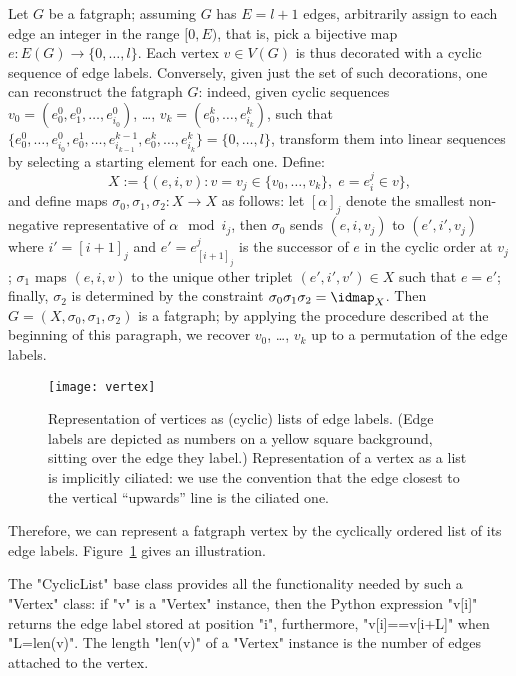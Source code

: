 Let $G$ be a fatgraph; assuming $G$ has $E = l+1$ edges, arbitrarily
assign to each edge an integer in the range $[0, E)$, that is, pick a
bijective map $e: E(G) \to \{0, \dots, l\}$.  Each vertex $v \in V(G)$
is thus decorated with a cyclic sequence of edge labels.  Conversely,
given just the set of such decorations, one can reconstruct the
fatgraph $G$: indeed, given cyclic sequences $v_0 = (e_0^0, e^0_1,
\ldots, e^0_{i_0})$, \ldots, $v_k = (e^k_0, \ldots, e^k_{i_k})$, such
that $\{e^0_0, \ldots, e^0_{i_0}, e^1_0, \ldots, e^{k-1}_{i_{k-1}},
e^k_0, \ldots, e^k_{i_k}\} = \{0, \ldots, l\}$, transform them into
linear sequences by selecting a starting element for each one.  Define:
\begin{equation*}
  X := \{ (e, i, v) : v = v_j \in \{v_0, \ldots, v_k\},\; 
                        e = e^j_i \in v \},
\end{equation*}
and define maps $\sigma_0, \sigma_1, \sigma_2: X \to X$ as follows:
let $[\alpha]_j$ denote the smallest non-negative representative of
$\alpha \mod i_j$, then $\sigma_0$ sends $(e, i, v_j)$ to $(e', i', v_j)$
where $i' = [i+1]_j$ and $e' = e^j_{[i+1]_j}$ is the successor
of $e$ in the cyclic order at $v_j$; $\sigma_1$ maps $(e, i, v)$ to the
unique other triplet $(e', i', v') \in X$ such that $e = e'$; finally,
$\sigma_2$ is determined by the constraint $\sigma_0\sigma_1\sigma_2 =
\idmap_X$.  Then $G = (X, \sigma_0, \sigma_1, \sigma_2)$ is a fatgraph;
by applying the procedure described at the beginning of this
paragraph, we recover $v_0$, \ldots, $v_k$ up to a permutation of the
edge labels.
\begin{figure}
  \centering
  \texttt{[image: vertex]}
  \caption{Representation of vertices as (cyclic) lists of edge
    labels.  (Edge labels are depicted as numbers on a yellow square
    background, sitting over the edge they label.)  Representation of
    a vertex as a list is implicitly ciliated: we use the convention
    that the edge closest to the vertical ``upwards'' line is the
    ciliated one.}
  \label{fig:vertex}
\end{figure}

Therefore, we can represent a fatgraph vertex by the cyclically
ordered list of its edge labels.  Figure~\ref{fig:vertex} gives an
illustration. 

The "CyclicList" base class provides all the functionality needed by
such a "Vertex" class: if "v" is a "Vertex" instance, then the
Python expression "v[i]" returns the edge label stored at
position "i", furthermore, "v[i]==v[i+L]" when "L=len(v)".
The length "len(v)" of a "Vertex" instance is the number of edges attached
to the vertex.  

